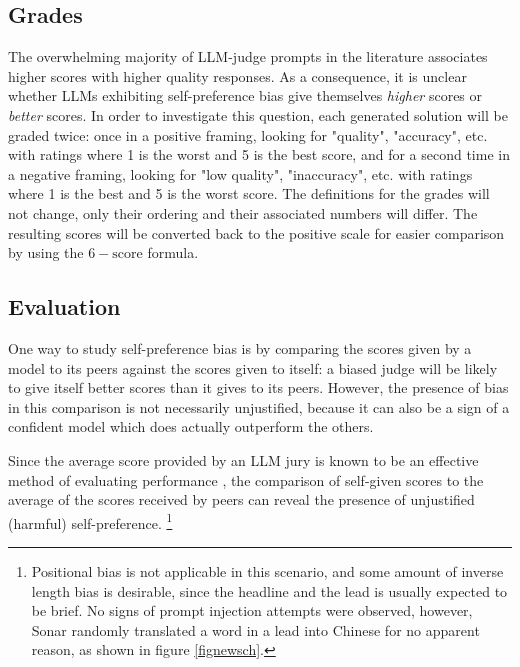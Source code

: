 \documentclass[UTF8,noindent,nohyp,parspace,titlepage,a4paper,12pt]{article}
\begin{document}
    \subsection{Grades}

      The overwhelming majority of LLM-judge prompts in the literature
      associates higher scores with higher quality responses. As a consequence,
      it is unclear whether LLMs exhibiting self-preference bias give
      themselves \emph{higher} scores or \emph{better} scores. In order to
      investigate this question, each generated solution will be graded twice:
      once in a positive framing, looking for "quality", "accuracy", etc. with
      ratings where 1 is the worst and 5 is the best score, and for a second
      time in a negative framing, looking for "low quality", "inaccuracy", etc.
      with ratings where 1 is the best and 5 is the worst score. The
      definitions for the grades will not change, only their ordering and their
      associated numbers will differ. The resulting scores will be converted
      back to the positive scale for easier comparison by using the
      $6 - \text{score}$ formula.

    \subsection{Evaluation}

      One way to study self-preference bias is by comparing the scores given by
      a model to its peers against the scores given to itself: a biased judge
      will be likely to give itself better scores than it gives to its peers.
      However, the presence of bias in this comparison is not necessarily
      unjustified, because it can also be a sign of a confident model which
      does actually outperform the others.

      Since the average score provided by an LLM jury is known to be an
      effective method of evaluating performance \cite{juries}, the comparison
      of self-given scores to the average of the scores received by peers can
      reveal the presence of unjustified (harmful) self-preference.
      \footnote{Positional bias is not applicable in this scenario, and some
      amount of inverse length bias is desirable, since the headline and the
      lead is usually expected to be brief. No signs of prompt injection
      attempts were observed, however, Sonar randomly translated a word in a
      lead into Chinese for no apparent reason, as shown in figure
      \ref{fignewsch}.}
\end{document}
